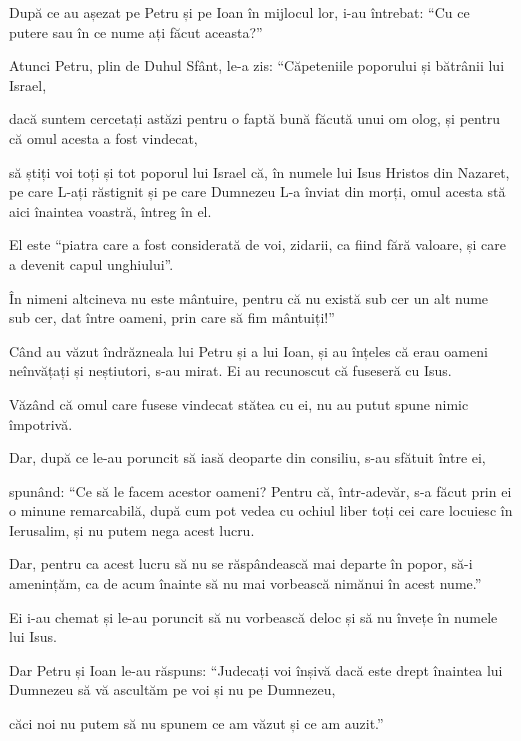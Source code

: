 {După ce au așezat pe Petru și pe Ioan în mijlocul lor, i-au întrebat: “Cu ce putere sau în ce nume ați făcut aceasta?”


\par }{\PP {}Atunci Petru, plin de Duhul Sfânt, le-a zis: “Căpeteniile poporului și bătrânii lui Israel,

dacă suntem cercetați astăzi pentru o faptă bună făcută unui om olog, și pentru că omul acesta a fost vindecat,

să știți voi toți și tot poporul lui Israel că, în numele lui Isus Hristos din Nazaret, pe care L-ați răstignit și pe care Dumnezeu L-a înviat din morți, omul acesta stă aici înaintea voastră, întreg în el.

El este “piatra care a fost considerată de voi, zidarii, ca fiind fără valoare, și care a devenit capul unghiului”.

În nimeni altcineva nu este mântuire, pentru că nu există sub cer un alt nume sub cer, dat între oameni, prin care să fim mântuiți!”


\par }{\PP {}Când au văzut îndrăzneala lui Petru și a lui Ioan, și au înțeles că erau oameni neînvățați și neștiutori, s-au mirat. Ei au recunoscut că fuseseră cu Isus.

Văzând că omul care fusese vindecat stătea cu ei, nu au putut spune nimic împotrivă.

Dar, după ce le-au poruncit să iasă deoparte din consiliu, s-au sfătuit între ei,

spunând: “Ce să le facem acestor oameni? Pentru că, într-adevăr, s-a făcut prin ei o minune remarcabilă, după cum pot vedea cu ochiul liber toți cei care locuiesc în Ierusalim, și nu putem nega acest lucru.

Dar, pentru ca acest lucru să nu se răspândească mai departe în popor, să-i amenințăm, ca de acum înainte să nu mai vorbească nimănui în acest nume.”

Ei i-au chemat și le-au poruncit să nu vorbească deloc și să nu învețe în numele lui Isus.


\par }{\PP {}Dar Petru și Ioan le-au răspuns: “Judecați voi înșivă dacă este drept înaintea lui Dumnezeu să vă ascultăm pe voi și nu pe Dumnezeu,

căci noi nu putem să nu spunem ce am văzut și ce am auzit.”


}
